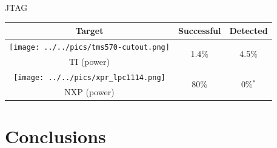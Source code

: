 \documentclass[table]{beamer}
\begin{document}
\begin{frame}{JTAG}
    \begin{table}[H]
          \centering
          \begin{tabular}{c c c}
          \toprule
            \cellcolor{white!100} Target & Successful & Detected \\
            \midrule
            \texttt{[image: ../../pics/tms570-cutout.png]} & \multirow{ 2}{*}{1.4\%} & \multirow{ 2}{*}{4.5\%} \\ TI (power) & &\\
            \cmidrule{1-3}
            \texttt{[image: ../../pics/xpr\_lpc1114.png]} & \multirow{ 2}{*}{80\%} & \multirow{ 2}{*}{0\%$^*$} \\ NXP (power) & &\\
          \bottomrule
          \end{tabular}
    \end{table}
\end{frame}


\section{Conclusions\ \ }

\begin{frame}
    \tableofcontents[currentsection]
\end{frame}
\end{document}
